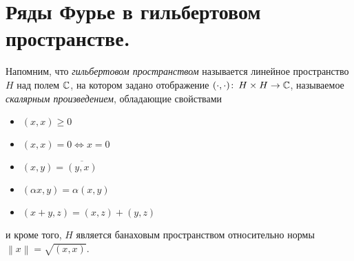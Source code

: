 \documentclass[../complex-analysis.tex]{subfiles}
\begin{document}
 
\newpage
\section{Ряды Фурье в гильбертовом пространстве.}

Напомним, что \textit{гильбертовом пространством} называется линейное пространство $ H $ над полем $ \mathbb{C} $, на котором задано отображение $ (\cdot,\cdot) \colon\, H \times H \to \mathbb{C} $, называемое \textit{скалярным произведением}, обладающие свойствами
\begin{itemize}
 \item $ (x,x) \geqslant 0 $
 \item $ (x,x) = 0 \iff x = 0 $
 \item $ (x,y) = \overline{(y,x)} $
 \item $ (\alpha x, y) = \alpha(x,y) $
 \item $ (x + y, z) = (x,z) + (y,z) $
\end{itemize} и кроме того, $ H $ является банаховым пространством относительно нормы $ \left\| x \right\|  = \sqrt{(x,x)}$.
\end{document}
